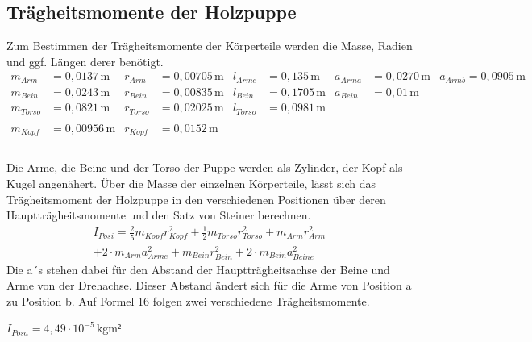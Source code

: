 \documentclass[titlepage = firstcover]{scrartcl}
\begin{document}
      \subsection{Trägheitsmomente der Holzpuppe}

      
      Zum Bestimmen der Trägheitsmomente der Körperteile werden die Masse, Radien und ggf. Längen derer benötigt.
      \begin{align*}
        m_{Arm} &= 0,0137 \, \text{m} & r_{Arm} &= 0,00705 \, \text{m} & l_{Arme} &= 0,135 \, \text{m} & a_{Arma} &= 0,0270 \, \text{m} & a_{Armb} = 0,0905 \, \text{m} \\
        m_{Bein} &= 0,0243 \, \text{m} & r_{Bein} &= 0,00835 \, \text{m} & l_{Bein} &= 0,1705 \, \text{m} & a_{Bein} &= 0,01 \, \text{m} & \\
        m_{Torso} &= 0,0821 \, \text{m} &  r_{Torso} &= 0,02025 \, \text{m} & l_{Torso} &= 0,0981 \, \text{m} & \\ & \\
        m_{Kopf} &= 0,00956 \, \text{m} & r_{Kopf} &= 0,0152 \, \text{m} & \\ & \\ &
      \end{align*}

      Die Arme, die Beine und der Torso der Puppe werden als Zylinder, der Kopf als Kugel angenähert.
      Über die Masse der einzelnen Körperteile, lässt sich das Trägheitsmoment der Holzpuppe in den verschiedenen Positionen über deren Hauptträgheitsmomente und 
      den Satz von Steiner berechnen.
      \begin{equation}
        \begin{split}
          I_{Posi} = \frac{2}{5} m_{Kopf}r_{Kopf}^2 + \frac{1}{2} m_{Torso} r_{Torso}^2 + m_{Arm} r_{Arm}^2 \\
                    + 2 \cdot m_{Arm} a_{Arme}^2 + m_{Bein} r_{Bein}^2 + 2 \cdot m_{Bein} a_{Beine}^2
        \end{split}
      \end{equation}
      Die a´s stehen dabei für den Abstand der Hauptträgheitsachse der Beine und Arme von der Drehachse. Dieser Abstand ändert sich für die Arme von Position a 
      zu Position b. Auf Formel 16 folgen zwei verschiedene Trägheitsmomente.\newline
      
      $I_{Posa} = 4,49 \cdot 10^{-5} \, \text{kgm²}$ \newline
      
\end{document}
